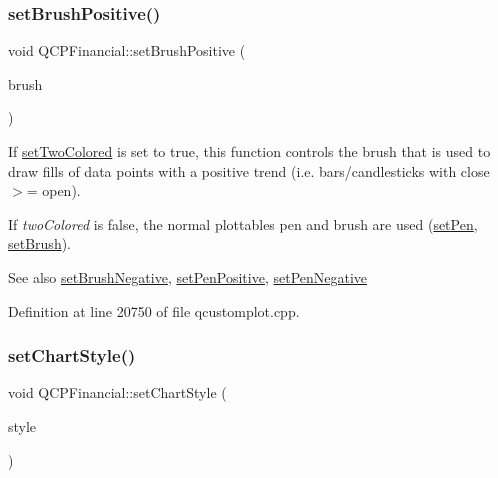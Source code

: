 \mbox{\label{class_q_c_p_financial_a5ebff2b1764efd07cc44942e67821829}} 
\subsubsection{\texorpdfstring{set\+Brush\+Positive()}{setBrushPositive()}}
{\footnotesize\ttfamily void Q\+C\+P\+Financial\+::set\+Brush\+Positive (\begin{DoxyParamCaption}\item[{const Q\+Brush \&}]{brush }\end{DoxyParamCaption})}

If \hyperlink{class_q_c_p_financial_a138e44aac160a17a9676652e240c5f08}{set\+Two\+Colored} is set to true, this function controls the brush that is used to draw fills of data points with a positive trend (i.\+e. bars/candlesticks with close $>$= open).

If {\itshape two\+Colored} is false, the normal plottable\textquotesingle{}s pen and brush are used (\hyperlink{class_q_c_p_abstract_plottable_ab74b09ae4c0e7e13142fe4b5bf46cac7}{set\+Pen}, \hyperlink{class_q_c_p_abstract_plottable_a7a4b92144dca6453a1f0f210e27edc74}{set\+Brush}).

\begin{DoxySeeAlso}{See also}
\hyperlink{class_q_c_p_financial_a8bbdd87629f9144b3ef51af660c0961a}{set\+Brush\+Negative}, \hyperlink{class_q_c_p_financial_ac58aa3adc7a35aab0088764b840683e5}{set\+Pen\+Positive}, \hyperlink{class_q_c_p_financial_afe5c07e94ccea01a75b3a2476993c346}{set\+Pen\+Negative} 
\end{DoxySeeAlso}


Definition at line 20750 of file qcustomplot.\+cpp.

\mbox{\label{class_q_c_p_financial_a5a59175d36279d71596e64d7bb65596f}} 
\subsubsection{\texorpdfstring{set\+Chart\+Style()}{setChartStyle()}}
{\footnotesize\ttfamily void Q\+C\+P\+Financial\+::set\+Chart\+Style (\begin{DoxyParamCaption}\item[{\hyperlink{class_q_c_p_financial_a0f800e21ee98d646dfc6f8f89d10ebfb}{Q\+C\+P\+Financial\+::\+Chart\+Style}}]{style }\end{DoxyParamCaption})}

